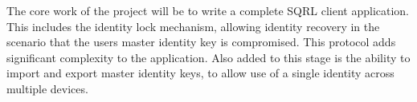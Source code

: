 The core work of the project will be to write a complete SQRL client application. This includes the identity lock mechanism, allowing identity recovery in the scenario that the users master identity key is compromised. This protocol adds significant complexity to the application. Also added to this stage is the ability to import and export master identity keys, to allow use of a single identity across multiple devices.
